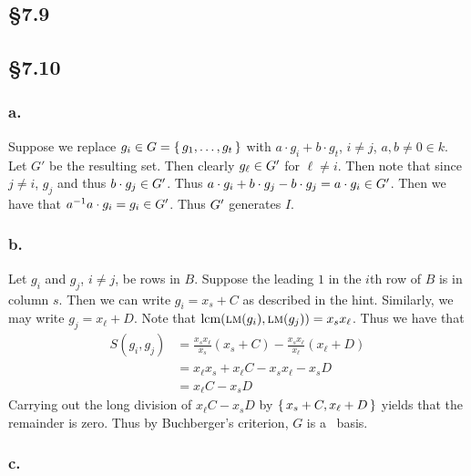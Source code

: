 \documentclass[letterpaper]{article}
\begin{document}
\subsection*{\S 7.9}


\subsection*{\S 7.10}

\subsubsection*{a.}

Suppose we replace $g_{i} \in G = \set{g_{1}, \ldots, g_{t}}$ with $a \cdot g_{i} + b \cdot g_{t}$, $i \neq j$, $a,b \neq 0 \in k$.
Let $G'$ be the resulting set.
Then clearly $g_{\ell} \in \gen{G'}$ for $\ell \neq i$.
Then note that since $j \neq i$, $g_{j}$ and thus $b \cdot g_{j} \in \gen{G'}$.
Thus $a \cdot g_{i} + b \cdot g_{j} - b \cdot g_{j} = a \cdot g_{i} \in \gen{G'}$.
Then we have that $a^{-1} a \cdot g_{i} = g_{i} \in \gen{G'}$.
Thus $\gen{G'}$ generates $I$.

\clearpage

\subsubsection*{b.}

Let $g_{i}$ and $g_{j}$, $i \neq j$, be rows in $B$.
Suppose the leading $1$ in the $i$th row of $B$ is in column $s$.
Then we can write $g_{i} = x_{s} + C$ as described in the hint.
Similarly, we may write $g_{j} = x_{\ell} + D$.
Note that $\operatorname{lcm}(\operatorname{\textsc{lm}}(g_{i}), \operatorname{\textsc{lm}}(g_{j})) = x_{s}x_{\ell}$.
Thus we have that
\begin{align*}
  S(g_{i}, g_{j}) &= \frac{x_{s} x_{\ell}}{x_{s}}(x_{s} + C) - \frac{x_{s} x_{\ell}}{x_{\ell}} (x_{\ell} + D) \\
                  &= x_{\ell}x_{s} + x_{\ell} C - x_{s} x_{\ell} - x_{s} D \\
                  &= x_{\ell} C - x_{s} D
\end{align*}
Carrying out the long division of $x_{\ell} C - x_{s} D$ by $\set{x_{s} + C, x_{\ell} + D}$ yields that the remainder is zero.
Thus by Buchberger's criterion, $G$ is a \Grobner\ basis.

\subsubsection*{c.}
\end{document}
